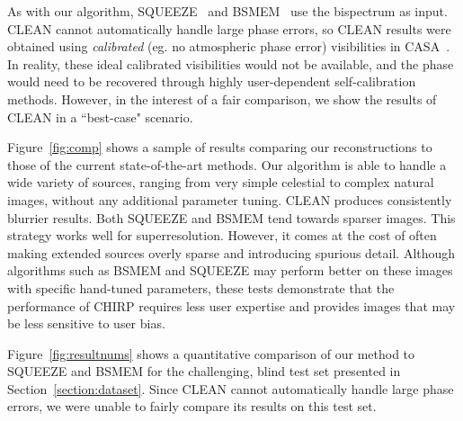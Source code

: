 As with our algorithm, SQUEEZE~\cite{baron2010novel} and BSMEM~\cite{buscher1994direct} use the bispectrum as input. 
CLEAN cannot automatically handle large phase errors, so CLEAN results were obtained using {\it calibrated} (eg. no atmospheric phase error) visibilities in CASA~\cite{jaeger2008common}. In reality, these ideal calibrated visibilities would not be available, and the phase would need to be recovered through highly user-dependent self-calibration methods. However, in the interest of a fair comparison, we show the results of CLEAN in a ``best-case" scenario. 

Figure~\ref{fig:comp} shows a sample of results comparing our reconstructions to those of the current state-of-the-art methods. Our algorithm is able to handle a wide variety of sources, ranging from very simple celestial to complex natural images, without any additional parameter tuning. 
CLEAN produces consistently blurrier results. %
Both SQUEEZE and BSMEM tend towards sparser images. This strategy works well for superresolution.
However, it comes at the cost of often making extended sources overly sparse and introducing spurious detail. 
Although algorithms such as BSMEM and SQUEEZE may perform better on these images with specific hand-tuned parameters, these tests demonstrate that the performance of CHIRP requires less user expertise and provides images that may be less sensitive to user bias.

Figure~\ref{fig:resultnums} shows a quantitative comparison of our method to SQUEEZE and BSMEM for the challenging, blind test set presented in Section~\ref{section:dataset}. 
Since CLEAN cannot automatically handle large phase errors, we were unable to fairly compare its results on this test set. %



